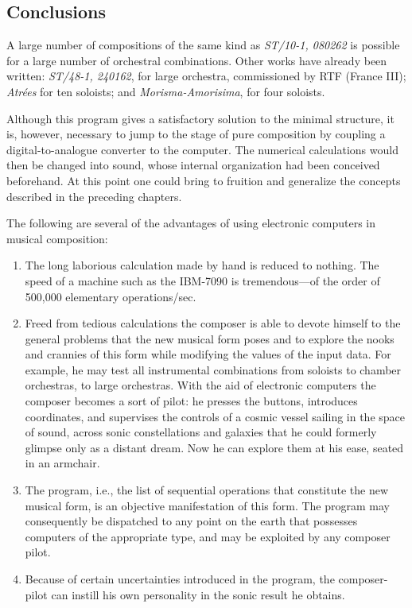 \documentclass[letterpaper, 11pt]{article}
\begin{document}
\subsection*{Conclusions}

A large number of compositions of the same kind as \textit{ST/10-1, 080262} is possible for a large number of orchestral combinations.
Other works have already been written: \textit{ST/48-1, 240162}, for large orchestra, commissioned by RTF (France III); \textit{Atrées} for ten soloists; and \textit{Morisma-Amorisima}, for four soloists.

Although this program gives a satisfactory solution to the minimal structure, it is, however, necessary to jump to the stage of pure composition by coupling a digital-to-analogue converter to the computer.
The numerical calculations would then be changed into sound, whose internal organization had been conceived beforehand.
At this point one could bring to fruition and generalize the concepts described in the preceding chapters.

The following are several of the advantages of using electronic computers in musical composition:

\begin{enumerate}
    \item
        The long laborious calculation made by hand is reduced to nothing.
        The speed of a machine such as the IBM-7090 is tremendous---of the order of 500,000 elementary operations/sec.
    \item
        Freed from tedious calculations the composer is able to devote himself to the general problems that the new musical form poses and to explore the nooks and crannies of this form while modifying the values of the input data.
        For example, he may test all instrumental combinations from soloists to chamber orchestras, to large orchestras.
        With the aid of electronic computers the composer becomes a sort of pilot: he presses the buttons, introduces coordinates, and supervises the controls of a cosmic vessel sailing in the space of sound, across sonic constellations and galaxies that he could formerly glimpse only as a distant dream.
        Now he can explore them at his ease, seated in an armchair.
    \item 
        The program, i.e., the list of sequential operations that constitute the new musical form, is an objective manifestation of this form.
        The program may consequently be dispatched to any point on the earth that possesses computers of the appropriate type, and may be exploited by any composer pilot.
    \item 
        Because of certain uncertainties introduced in the program, the composer-pilot can instill his own personality in the sonic result he obtains.
\end{enumerate}
\end{document}
